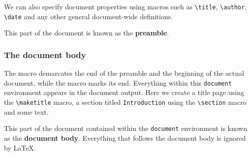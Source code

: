 			We can also specify document properties using macros such as \lstinline|\title|, \lstinline|\author|, \lstinline|\date| and any other general document-wide definitions.
			
			This part of the document is known as the \textbf{preamble}.


		\subsubsection{The document body}
			The \lstinline|| macro demarcates the end of the preamble and the beginning of the actual document, while the \lstinline|| macro marks its end. Everything within this \verb|document| environment appears in the document output. Here we create a title page using the \lstinline|\maketitle| macro, a section titled \verb|Introduction| using the \lstinline|\section| macro and some text.
			
			This part of the document contained within the \verb|document| environment is known as the \textbf{document body}. Everything that follows the document body is ignored by \LaTeX.
